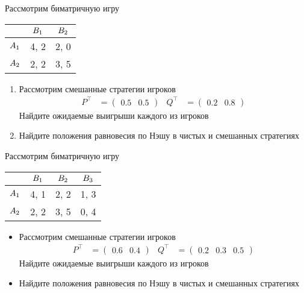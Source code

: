 \begin{exercise}
Рассмотрим биматричную игру
\begin{center}
	\begin{tabular}{|c||c|c|}
	\hline
	& $B_{1}$ & $B_{2}$  \\ \hline \hline
	$A_1$ & 4, 2 & 2, 0  \\ \hline
	$A_2$ & 2, 2 & 3, 5  \\ %
	\hline
	\end{tabular}
\end{center}
\begin{enumerate}
	\item Рассмотрим смешанные стратегии игроков 
	\begin{align*}
		P^\top&=\begin{pmatrix} 0.5 & 0.5 \end{pmatrix} &
		Q^\top&=\begin{pmatrix} 0.2 & 0.8 \end{pmatrix}
	\end{align*}
	Найдите ожидаемые выигрыши каждого из игроков
	\item Найдите положения равновесия по Нэшу в чистых и смешанных стратегиях
\end{enumerate}
\end{exercise}

\begin{exercise}
Рассмотрим биматричную игру
\begin{center}
	\begin{tabular}{|c||c|c|c|}
	\hline
	& $B_{1}$ & $B_{2}$  & $B_{3}$ \\ \hline \hline
	$A_1$ & 4, 1 & 2, 2 & 1, 3  \\ \hline
	$A_2$ & 2, 2 & 3, 5 & 0, 4 \\ %
	\hline
	\end{tabular}
\end{center}
\begin{itemize}
	\item Рассмотрим смешанные стратегии игроков 
	\begin{align*}
		P^\top&=\begin{pmatrix} 0.6 & 0.4 \end{pmatrix} &
		Q^\top&=\begin{pmatrix} 0.2 & 0.3 & 0.5 \end{pmatrix}
	\end{align*}
	Найдите ожидаемые выигрыши каждого из игроков
	\item Найдите положения равновесия по Нэшу в чистых и смешанных стратегиях
\end{itemize}
\end{exercise}

